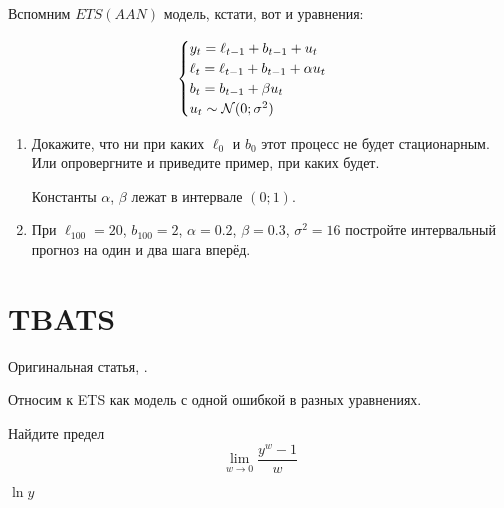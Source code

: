 \begin{problem}
Вспомним $ETS(AAN)$ модель, кстати, вот и уравнения:

\[
\begin{cases}
y_t = \ell_{t-1} + b_{t-1} + u_t \\
\ell_t = \ell_{t-1} + b_{t-1} + \alpha u_t \\
b_t = b_{t-1} + \beta u_t \\
u_t \sim \mathcal{N}(0;\sigma^2) \\
\end{cases}
\]

\begin{enumerate}
	\item 
	Докажите, что ни при каких $\ell_0$ и $b_0$ этот процесс не будет стационарным. 
	Или опровергните и приведите пример, при каких будет. 
	
	Константы $\alpha$, $\beta$ лежат в интервале $(0;1)$.
	
	\item При $\ell_{100} = 20$, $b_{100} = 2$, $\alpha=0.2$, $\beta=0.3$, $\sigma^2 = 16$ постройте
	интервальный прогноз на один и два шага вперёд. 
\end{enumerate}
\begin{sol}
\end{sol}
\end{problem}





\chapter{TBATS}

Оригинальная статья, \cite{de2011forecasting}.

Относим к ETS как модель с одной ошибкой в разных уравнениях. 

\begin{problem}
  Найдите предел
  \[
    \lim_{w \to 0} \frac{y^w - 1}{w}
  \]
\begin{sol}
  $\ln y$
\end{sol}
\end{problem}


